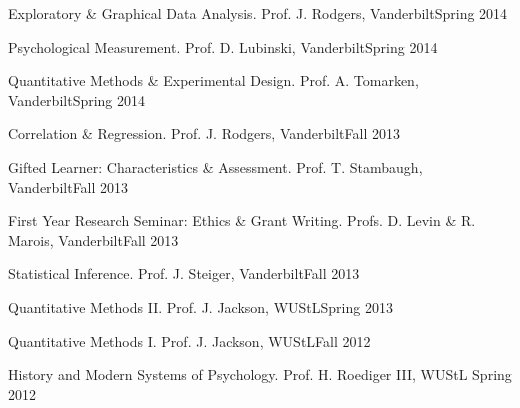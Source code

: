 \begin{etaremune}
\item Exploratory \& Graphical Data Analysis. Prof. J. Rodgers, Vanderbilt\hfill{Spring 2014}
\item Psychological Measurement. Prof. D. Lubinski, Vanderbilt\hfill{Spring 2014}
\item Quantitative Methods \& Experimental Design. Prof. A. Tomarken, Vanderbilt\hfill{Spring 2014}
\item Correlation \& Regression. Prof. J. Rodgers, Vanderbilt\hfill{Fall 2013}
\item Gifted Learner: Characteristics \& Assessment. Prof. T. Stambaugh, Vanderbilt\hfill{Fall 2013}
\item First Year Research Seminar: Ethics \& Grant Writing. Profs. D. Levin \& R. Marois, Vanderbilt\hfill{Fall 2013}
\item Statistical Inference. Prof. J. Steiger, Vanderbilt\hfill{Fall 2013}
\item Quantitative Methods \textrm{II}. Prof. J. Jackson, WUStL\hfill{Spring 2013}
\item Quantitative Methods \textrm{I}. Prof. J. Jackson, WUStL\hfill{Fall 2012}
\item History and Modern Systems of Psychology. Prof. H. Roediger \textrm{III}, WUStL \hfill{Spring 2012}\end{etaremune}